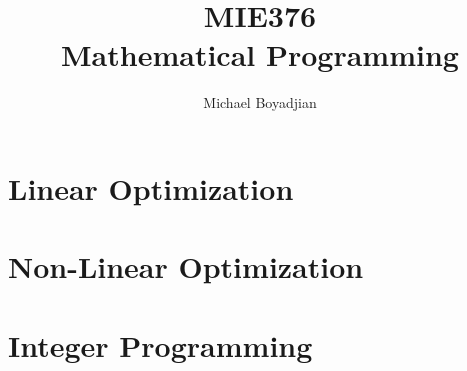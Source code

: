 \documentclass[11pt]{article}
\begin{document}
\title{MIE376  \\ Mathematical Programming}
\author{Michael Boyadjian}
\maketitle
\pagebreak

\tableofcontents

\pagebreak

\bigskip
\bigskip
\bigskip


\section{Linear Optimization}
\section{Non-Linear Optimization}
\section{Integer Programming}
\end{document}
